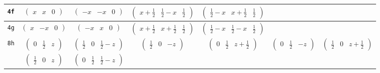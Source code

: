 \documentclass[fleqn,9pt,landscape]{jsarticle}
\begin{document}
\begin{center}
\begin{longtable}{ccccccc}
{\tt 4f} & $ \begin{pmatrix} x & x & 0 \end{pmatrix} $ & $ \begin{pmatrix} - x & - x & 0 \end{pmatrix} $ & $ \begin{pmatrix} x + \frac{1}{2} & \frac{1}{2} - x & \frac{1}{2} \end{pmatrix} $ & $ \begin{pmatrix} \frac{1}{2} - x & x + \frac{1}{2} & \frac{1}{2} \end{pmatrix} $ & $  $ & $  $ \\ \hline
{\tt 4g} & $ \begin{pmatrix} x & - x & 0 \end{pmatrix} $ & $ \begin{pmatrix} - x & x & 0 \end{pmatrix} $ & $ \begin{pmatrix} x + \frac{1}{2} & x + \frac{1}{2} & \frac{1}{2} \end{pmatrix} $ & $ \begin{pmatrix} \frac{1}{2} - x & \frac{1}{2} - x & \frac{1}{2} \end{pmatrix} $ & $  $ & $  $ \\ \hline
{\tt 8h} & $ \begin{pmatrix} 0 & \frac{1}{2} & z \end{pmatrix} $ & $ \begin{pmatrix} \frac{1}{2} & 0 & \frac{1}{2} - z \end{pmatrix} $ & $ \begin{pmatrix} \frac{1}{2} & 0 & - z \end{pmatrix} $ & $ \begin{pmatrix} 0 & \frac{1}{2} & z + \frac{1}{2} \end{pmatrix} $ & $ \begin{pmatrix} 0 & \frac{1}{2} & - z \end{pmatrix} $ & $ \begin{pmatrix} \frac{1}{2} & 0 & z + \frac{1}{2} \end{pmatrix} $ \\
& $ \begin{pmatrix} \frac{1}{2} & 0 & z \end{pmatrix} $ & $ \begin{pmatrix} 0 & \frac{1}{2} & \frac{1}{2} - z \end{pmatrix} $ & $  $ & $  $ & $  $ & $  $ \\ \hline

\end{longtable}
\end{center}
\end{document}
